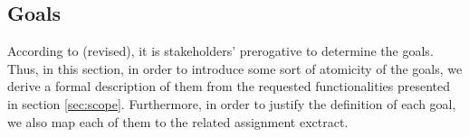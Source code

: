 \subsection{Goals}
According to \cite{jackson_dsfr} (revised), it is stakeholders' prerogative to determine the goals. Thus, in this section, in order to introduce some sort of atomicity of the goals, we derive a formal description of them from the requested functionalities presented in section \ref{sec:scope}. Furthermore, in order to justify the definition of each goal, we also map each of them to the related assignment exctract.
\newline\newline
{}
\newline\newline
{}
\newline\newline
{}

